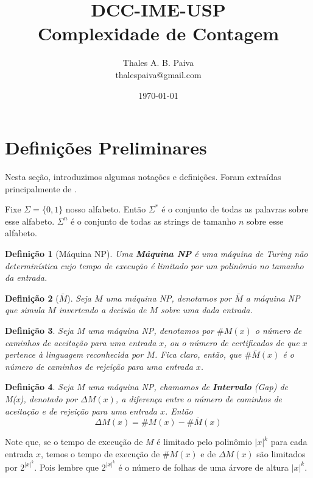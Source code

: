 \documentclass[paper=a4, fontsize=11pt]{scrartcl} %
\title{	
\normalfont \normalsize 
\textsc{DCC-IME-USP} \\ [25pt] %
\huge Complexidade de Contagem \\ %
}
\author{Thales A. B. Paiva \\ thalespaiva@gmail.com} %
\date{\normalsize\today} %
\newtheorem{definition}{Definição}
\numberwithin{equation}{section} %
\numberwithin{figure}{section} %
\numberwithin{table}{section} %
\numberwithin{definition}{section}
\numberwithin{theorem}{section}
\begin{document}
\maketitle %
\tableofcontents



\pagebreak
\section{Definições Preliminares}

Nesta seção, introduzimos algumas notações e definições. Foram extraídas principalmente de \cite{Fortnow97}.

Fixe $\Sigma = \{0, 1\}$ nosso alfabeto. Então $\Sigma^*$ é o conjunto de todas as palavras sobre esse alfabeto. $\Sigma^n$ é o conjunto de todas as strings de tamanho $n$ sobre esse alfabeto. 

\begin{definition}[Máquina NP] Uma \textbf{Máquina NP} é uma máquina de Turing não determinística cujo tempo de execução é limitado por um polinômio no tamanho da entrada.
\end{definition}

\begin{definition}[$\bar{M}$] Seja $M$ uma máquina NP, denotamos por \textbf{$\bar{M}$} a máquina NP que simula $M$ invertendo a decisão de $M$ sobre uma dada entrada.
\end{definition}

\begin{definition} Seja $M$ uma máquina NP, denotamos por $\#M(x)$ o número de caminhos de aceitação para uma entrada $x$, ou o número de certificados de que $x$ pertence à linguagem reconhecida por $M$. Fica claro, então, que $\#\bar{M}(x)$ é o número de caminhos de rejeição para uma entrada $x$.
\end{definition}

\begin{definition} Seja $M$ uma máquina NP, chamamos de \textbf{Intervalo} (\textit{Gap}) de M(x), denotado por $\Delta M(x)$, a diferença entre o número de caminhos de aceitação e de rejeição para uma entrada $x$. Então
\[
\Delta M(x) = \#M(x) - \#\bar{M}(x)
\]
\end{definition}

Note que, se o tempo de execução de $M$ é limitado pelo polinômio $|x|^k$ para cada entrada $x$, temos o tempo de execução de $\#M(x)$ e de $\Delta M(x)$ são limitados por $2^{|x|^k}$. Pois lembre que $2^{|x|^k}$ é o número de folhas de uma árvore de altura $|x|^k$.
\end{document}
